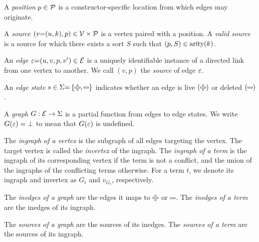\begin{definition}
  A \emph{position} $p \in \P$ is a constructor-specific location from which edges may originate.
\end{definition}

\begin{definition}
  A \emph{source} $(v{=}(u, k), p) \in \V \times \P$ is a vertex paired with a position.
  A \emph{valid source} is a source for which there exists a sort $S$ such that $(p, S) \in \arity{k}$.
\end{definition}

\begin{definition}
  An \emph{edge} $\e{=}(u, v, p, v^\prime) \in \E$ is a uniquely identifiable instance of a directed link from one vertex to another.
  We call $(v, p)$ the \emph{source} of edge $\e$.
\end{definition}

\begin{definition}
  An \emph{edge state} $s \in \Sigma{=}\SetOf{\Plus, \Minus}$ indicates whether an edge is live $\left(\Plus\right)$ or deleted $\left(\Minus\right)$.
\end{definition}

\begin{definition}
  A \emph{graph} $G : \E \rightarrow \Sigma$ is a partial function from edges to edge states.
  We write $G(\e) = \bot$ to mean that $G(\e)$ is undefined.
\end{definition}

\begin{definition}
  The \emph{ingraph of a vertex} is the subgraph of all edges targeting the vertex.
  The target vertex is called the \emph{invertex} of the ingraph.
  The \emph{ingraph of a term} is the ingraph of its corresponding vertex if the term is not a conflict,
  and the union of the ingraphs of the conflicting terms otherwise.
  For a term $t$, we denote its ingraph and invertex as $G_t$ and $v_{G_t}$, respectively.
\end{definition}

\begin{definition}
  The \emph{inedges of a graph} are the edges it maps to $\Plus$ or $\Minus$.
  The \emph{inedges of a term} are the inedges of its ingraph.
\end{definition}

\begin{definition}
  The \emph{sources of a graph} are the sources of its inedges.
  The \emph{sources of a term} are the sources of its ingraph.
\end{definition}

